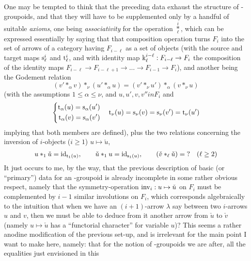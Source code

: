 One may be tempted to think that the preceding data exhaust the
structure of \oo-groupoids, and that they will have to be supplemented
only by a handful of suitable \emph{axioms}, one being
\emph{associativity} for the operation
$\overset{i}{\underset{\ell}{*}}$, which can be expressed essentially
by saying that that composition operation turns $F_i$ into the set of
arrows of a category having $F_{i-\ell}$ as a set of objects (with the
source and target maps $\mathrm{s}_\ell^i$ and $\mathrm{t}_\ell^i$, and with
identity map $\mathrm{k}_\ell^{i-\ell} : F_{i-\ell} \to F_i$ the
composition of the identity maps $F_{i-\ell} \to F_{i-\ell+1} \to
\dots \to F_{i-1} \to F_i$), and another being the Godement relation
\begin{equation*}
  (v' *_\alpha v) *_\nu (u' *_\alpha u) = (v' *_\nu u') *_\alpha (v
  *_\nu u)
\end{equation*}
(with the assumptions $1\le\alpha\le\nu$, and $u,u',v,v''in F_i$ and
\begin{equation*}
  \left\{\begin{aligned}
      \mathrm{t}_\alpha(u)=\mathrm{s}_\alpha(u') \\
      \mathrm{t}_\alpha(v)=\mathrm{s}_\alpha(v') \\
    \end{aligned}\right.\quad
  \mathrm{t}_\nu(u) = \mathrm{s}_\nu(v) = \mathrm{s}_\nu(v') = \mathrm{t}_\nu(u')
\end{equation*}
implying that both members are defined), plus the two relations
concerning the inversion of $i$-objects ($i\ge1$) $u \mapsto \check
u$,
\begin{multline*}
  u *_1 \check u = \operatorname{id}_{\mathrm{t}_1(u)} , \qquad \check u *_1 u =
  \operatorname{id}_{\mathrm{s}_1(u)} , \qquad
  (\check v *_\ell \check u) = \text{?} \quad(\ell\ge2)
\end{multline*}
It just occurs to me, by the way, that the previous description of
basic (or ``primary'') data for an \oo-groupoid is already incomplete
in some rather obvious respect, namely that the symmetry-operation
$\operatorname{inv}_i : u \mapsto \check u$ on $F_i$ must be complemented by $i-1$
similar involutions on $F_i$, which corresponds algebraically to the
intuition that when we have an $(i+1)$-arrow $\lambda$ say between two
$i$-arrows $u$ and $v$, then we must be able to deduce from it another
arrow from $\check u$ to $\check v$ (namely $u\mapsto\check u$ has a
``functorial character'' for variable $u$)? This seems a rather
anodine modification of the previous set-up, and is irrelevant for the
main point I want to make here, namely: that for the notion of
\oo-groupoids we are after, all the equalities just envisioned in this
